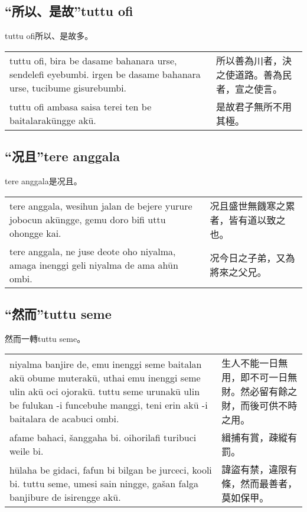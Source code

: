 \documentclass{article}
\begin{document}
\subsection{“所以、是故”tuttu ofi}
\noindent tuttu ofi所以、是故多。
\begin{center}
    \begin{tabularx}{\textwidth}{XX}
        tuttu ofi, bira be dasame bahanara urse, sendelefi eyebumbi. irgen be dasame bahanara urse, tucibume gisurebumbi. & 所以善為川者，決之使道路。善為民者，宣之使言。\\
        tuttu ofi ambasa saisa terei ten be baitalarak\={u}ngge ak\={u}. & 是故君子無所不用其極。
    \end{tabularx}
\end{center}

\subsection{“况且”tere anggala}
\noindent tere anggala是况且。
\begin{center}
    \begin{tabularx}{\textwidth}{XX}
        tere anggala, wesihun jalan de bejere yurure jobocun ak\={u}ngge, gemu doro bifi uttu ohongge kai. & 况且盛世無饑寒之累者，皆有道以致之也。\\
        tere anggala, ne juse deote oho niyalma, amaga inenggi geli niyalma de ama ah\={u}n ombi. &况今日之子弟，又為將來之父兄。
    \end{tabularx}
\end{center}

\subsection{“然而”tuttu seme}
\noindent 然而一轉tuttu seme。
\begin{center}
    \begin{tabularx}{\textwidth}{XX}
        niyalma banjire de, emu inenggi seme baitalan ak\={u} obume muterak\={u}, uthai emu inenggi seme ulin ak\={u} oci ojorak\={u}. tuttu seme urunak\={u} ulin be fulukan -i funcebuhe manggi, teni erin ak\={u} -i baitalara de acabuci ombi. &生人不能一日無用，即不可一日無財。然必留有餘之財，而後可供不時之用。\\
        afame bahaci, \v{s}anggaha bi. oihorilafi turibuci weile bi. & 緝捕有賞，疎縱有罰。\\
        h\={u}laha be gidaci, fafun bi bilgan be jurceci, kooli bi. tuttu seme, umesi sain ningge, ga\v{s}an falga banjibure de isirengge ak\={u}. & 諱盜有禁，違限有條，然而最善者，莫如保甲。
    \end{tabularx}
\end{center}
\end{document}
